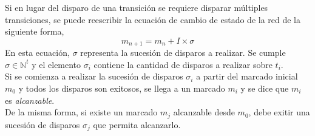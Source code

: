 Si en lugar del disparo de una transición se requiere disparar múltiples
transiciones, se puede reescribir la ecuación de cambio de estado de la red de
la siguiente forma,
$$ m_{n+1} = m_{n} + I \times \sigma $$
En esta ecuación, $\sigma$ representa la sucesión de disparos a realizar. Se
cumple $\sigma \in \mathbb{N}^{t}$ y el elemento $\sigma_{i}$ contiene la
cantidad de disparos a realizar sobre $t_{i}$.\\
Si se comienza a realizar la sucesión de disparos $\sigma_{i}$ a partir del
marcado inicial $m_{0}$ y todos los disparos son exitosos, se llega a un marcado
$m_{i}$ y se dice que $m_{i}$ es \textit{alcanzable}.\\
De la misma forma, si existe un marcado $m_{j}$ alcanzable desde $m_{0}$, debe
exitir una sucesión de disparos $\sigma_{j}$ que permita alcanzarlo.

